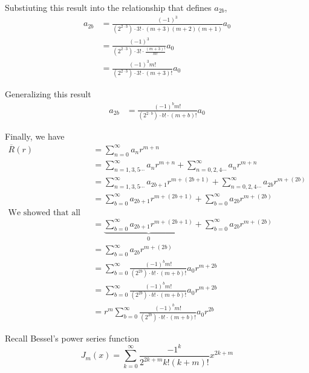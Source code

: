 \documentclass[11pt]{article}
\begin{document}
Substiuting this result into the relationship that defines \(a_{2b}\),
\begin{equation}
\begin{split}
a_{2b} &= \frac{ (-1)^3}{(2^{2 \cdot 3}) \cdot 3! \cdot (m + 3)(m + 2)(m + 1)} a_{0} \\
&= \frac{ (-1)^3}{(2^{2 \cdot 3}) \cdot 3! \cdot \frac{(m + 3)!}{m!}} a_{0} \\
&= \frac{ (-1)^3 m!}{(2^{2 \cdot 3}) \cdot 3! \cdot (m + 3)!} a_{0}
\end{split}
\end{equation}

Generalizing this result \begin{equation}
\begin{split}
a_{2b} &= \frac{(-1)^b m!}{(2^{2 \cdot b}) \cdot b! \cdot (m + b)!} a_{0}
\end{split}
\end{equation}

Finally, we have \begin{equation}
\begin{split} 
\overline{R}(r) &= \sum_{n=0}^{\infty} a_n r^{m + n} \\
&= \sum_{n=1,3,5 \cdots}^{\infty} a_{n} r^{m + n} + \sum_{n=0,2,4\cdots}^{\infty} a_{n} r^{m + n} \\
&= \sum_{n=1,3,5 \cdots}^{\infty} a_{2b+1} r^{m + (2b + 1)} + \sum_{n=0,2,4\cdots}^{\infty} a_{2b} r^{m + (2b)} \\
&= \sum_{b=0}^{\infty} a_{2b+1} r^{m + (2b + 1)} + \sum_{b=0}^{\infty} a_{2b} r^{m + (2b)} \\
\text{We showed that all odd terms are zero:}\\
&= \underbrace {\sum_{b=0}^{\infty} a_{2b+1} r^{m + (2b + 1)}}_{0} + \sum_{b=0}^{\infty} a_{2b} r^{m + (2b)} \\
&= \sum_{b=0}^{\infty} a_{2b} r^{m + (2b)} \\
&= \sum_{b=0}^{\infty} \frac{(-1)^b m!}{(2^{2b}) \cdot b! \cdot (m + b)!} a_{0} r^{m + 2b} \\
&= \sum_{b=0}^{\infty} \frac{(-1)^b m!}{(2^{2b}) \cdot b! \cdot (m + b)!} a_{0} r^{m + 2b} \\
&= r^m\sum_{b=0}^{\infty} \frac{(-1)^b m!}{(2^{2b}) \cdot b! \cdot (m + b)!} a_{0} r^{2b}
\end{split}
\end{equation}

Recall Bessel's power series function \begin{equation}
J_{m}(x) = \sum_{k=0}^{\infty} \frac{-1^k}{2^{2k+m} k! (k + m)!} x^{2k + m}
\end{equation}
\end{document}
